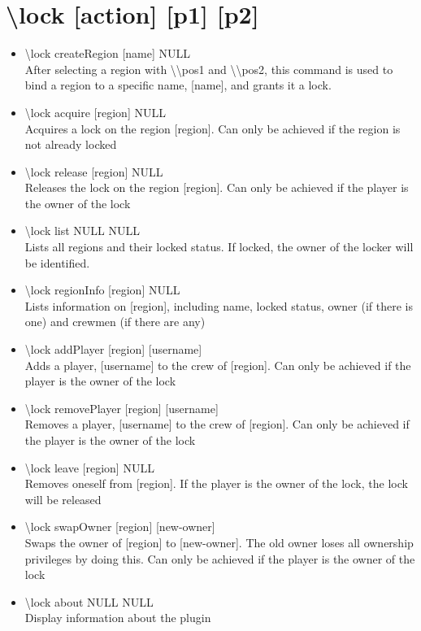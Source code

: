 \documentclass[a4paper,twoside,notitlepage,11pt]{article}
\begin{document}
\section{\textbackslash lock [action] [p1] [p2]}
\begin{itemize}
\item \textbackslash lock createRegion [name] NULL\\
After selecting a region with \textbackslash\textbackslash pos1 and \textbackslash\textbackslash pos2, this command is used to bind a region to a specific name, [name], and grants it a lock.
\item \textbackslash lock acquire [region] NULL\\
Acquires a lock on the region [region]. Can only be achieved if the region is not already locked
\item \textbackslash lock release [region] NULL\\
Releases the lock on the region [region]. Can only be achieved if the player is the owner of the lock
\item \textbackslash lock list NULL NULL\\
Lists all regions and their locked status. If locked, the owner of the locker will be identified.
\item \textbackslash lock regionInfo [region] NULL\\
Lists information on [region], including name, locked status, owner (if there is one) and crewmen (if there are any)
\item \textbackslash lock addPlayer [region] [username]\\
Adds a player, [username] to the crew of [region]. Can only be achieved if the player is the owner of the lock
\item \textbackslash lock removePlayer [region] [username]\\
Removes a player, [username] to the crew of [region]. Can only be achieved if the player is the owner of the lock
\item \textbackslash lock leave [region] NULL\\
Removes oneself from [region]. If the player is the owner of the lock, the lock will be released
\item \textbackslash lock swapOwner [region] [new-owner]\\
Swaps the owner of [region] to [new-owner]. The old owner loses all ownership privileges by doing this. Can only be achieved if the player is the owner of the lock
\item \textbackslash lock about NULL NULL \\
Display information about the plugin
\end{itemize}
\end{document}
